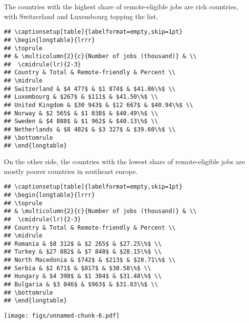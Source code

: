 \documentclass[11pt,]{article}
\begin{document}
The countries with the highest share of remote-eligible jobs are rich
countries, with Switzerland and Luxembourg topping the list.

\begin{verbatim}
## \captionsetup[table]{labelformat=empty,skip=1pt}
## \begin{longtable}{lrrr}
## \toprule
## & \multicolumn{2}{c}{Number of jobs (thousand)} & \\ 
##  \cmidrule(lr){2-3}
## Country & Total & Remote-friendly & Percent \\ 
## \midrule
## Switzerland & $4 477$ & $1 874$ & $41.86\%$ \\ 
## Luxembourg & $267$ & $111$ & $41.50\%$ \\ 
## United Kingdom & $30 943$ & $12 667$ & $40.94\%$ \\ 
## Norway & $2 565$ & $1 038$ & $40.49\%$ \\ 
## Sweden & $4 888$ & $1 962$ & $40.13\%$ \\ 
## Netherlands & $8 402$ & $3 327$ & $39.60\%$ \\ 
## \bottomrule
## \end{longtable}
\end{verbatim}

On the other side, the countries with the lowest share of
remote-eligible jobs are mostly poorer countries in southeast europe.

\begin{verbatim}
## \captionsetup[table]{labelformat=empty,skip=1pt}
## \begin{longtable}{lrrr}
## \toprule
## & \multicolumn{2}{c}{Number of jobs (thousand)} & \\ 
##  \cmidrule(lr){2-3}
## Country & Total & Remote-friendly & Percent \\ 
## \midrule
## Romania & $8 312$ & $2 265$ & $27.25\%$ \\ 
## Turkey & $27 882$ & $7 848$ & $28.15\%$ \\ 
## North Macedonia & $742$ & $213$ & $28.71\%$ \\ 
## Serbia & $2 671$ & $817$ & $30.58\%$ \\ 
## Hungary & $4 398$ & $1 384$ & $31.48\%$ \\ 
## Bulgaria & $3 046$ & $963$ & $31.63\%$ \\ 
## \bottomrule
## \end{longtable}
\end{verbatim}

\texttt{[image: figs/unnamed-chunk-6.pdf]}
\end{document}
